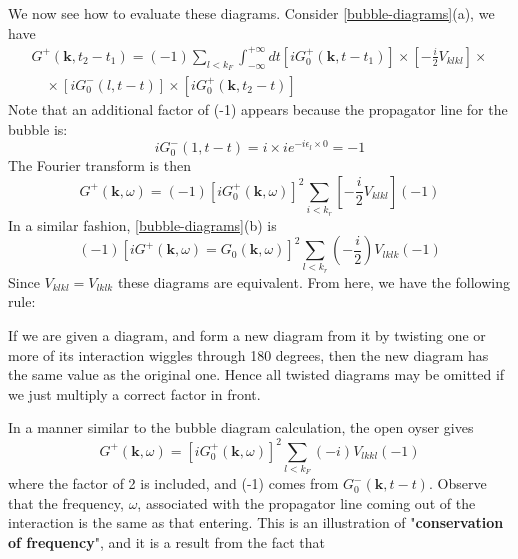 We now see how to evaluate these diagrams. Consider \ref{bubble-diagrams}(a), we have
\begin{equation}\begin{array}{l}
G^+(\mathbf{k},t_2-t_1)=(-1) \sum_{l<k_{F}} \int_{-\infty}^{+\infty} d t\left[i G_{0}^{+}\left(\mathbf{k}, t-t_{1}\right)\right] \times\left[-\frac{i}{2} V_{k l k l}\right] \times \\
\quad \times\left[i G_{0}^{-}(l, t-t)\right] \times\left[i G_{0}^{+}\left(\mathbf{k}, t_{2}-t\right)\right]
\end{array}\end{equation}
 Note that an additional factor of (-1) appears because the propagator line for the bubble is:
\begin{equation}i G_{0}^{-}(1, t-t)=i \times i e^{-i\epsilon_l \times 0}=-1\end{equation}
The Fourier transform is then
\begin{equation}
G^+(\mathbf{k},\omega)=(-1)\left[i G_{0}^{+}(\mathbf{k}, \omega)\right]^{2} \sum_{i<k_{r}}\left[-\frac{i}{2} V_{k l k l}\right](-1)\end{equation}
In a similar fashion, \ref{bubble-diagrams}(b) is
\begin{equation}(-1)\left[i G^+(\mathbf{k},\omega)=G_{0}(\mathbf{k}, \omega)\right]^{2} \sum_{l<k_{r}}\left(-\frac{i}{2}\right) V_{l k l k}(-1)\end{equation}
Since $V_{klkl}=V_{lklk}$ these diagrams are equivalent. From here, we have the following rule:
\begin{imp}
If we are given a diagram, and form a new diagram from it by twisting one or more of its interaction wiggles through 180 degrees, then the new diagram has the same value as the original one. Hence all twisted diagrams may be omitted if we just multiply a correct factor in front.
\end{imp}
In a manner similar to the bubble diagram calculation, the open oyser gives
\begin{equation}
    G^+(\mathbf{k},\omega)=[iG^+_0(\mathbf{k},\omega)]^2\sum_{l<k_F}(-i)V_{lkkl}(-1)
\end{equation}
where the factor of 2 is included, and (-1) comes from $G^{-}_0(\mathbf{k},t-t)$. Observe that the frequency, $\omega$, associated with the propagator line coming out of the interaction is the same as that entering. This is an illustration of "\textbf{conservation of frequency}", and it is a result from the fact that 

